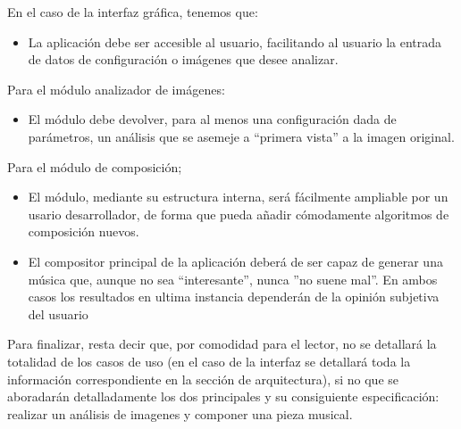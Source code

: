 En el caso de la interfaz gráfica, tenemos que:

\begin{itemize}
	\item La aplicación debe ser accesible al usuario, facilitando al usuario la entrada de datos de configuración o imágenes que desee analizar.

\end{itemize}

Para el módulo analizador de imágenes:

\begin{itemize}
	\item El módulo debe devolver, para al menos una configuración dada de parámetros, un análisis que se asemeje a ``primera vista'' a la imagen original.
\end{itemize}

Para el módulo de composición;
\begin{itemize}
	\item El módulo, mediante su estructura interna, será fácilmente ampliable por un usario desarrollador, de forma que pueda añadir cómodamente algoritmos de composición nuevos.
	\item El compositor principal de la aplicación deberá de ser capaz de generar una música que, aunque no sea ``interesante'', nunca ''no suene mal''. En ambos casos los resultados en ultima instancia dependerán de la opinión subjetiva del usuario
\end{itemize}

Para finalizar, resta decir que, por comodidad para el lector, no se detallará la totalidad de los casos de uso (en el caso de la interfaz se detallará toda la información correspondiente en la sección de arquitectura), si no que se aboradarán detalladamente los dos principales y su consiguiente especificación: realizar un análisis de imagenes y componer una pieza musical.






























